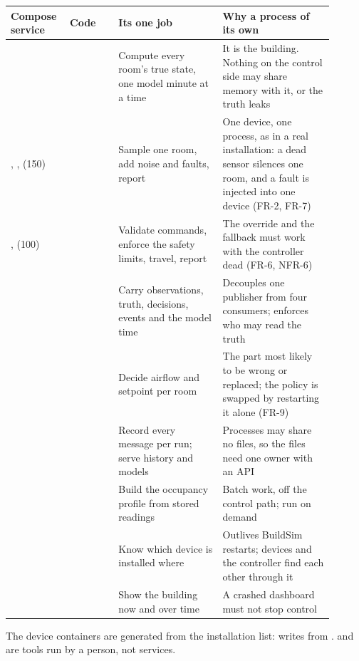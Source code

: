 \begin{longtable}[]{@{}L{0.14\linewidth}L{0.14\linewidth}L{0.30\linewidth}L{0.32\linewidth}@{}}
\toprule
\textbf{Compose service} & \textbf{Code} & \textbf{Its one job} & \textbf{Why a process of its own} \\
\midrule
\endhead
{} &  & Compute every room's true state, one
model minute at a time & It is the building. Nothing on the control side may
share memory with it, or the truth leaks \\
, ,  (150) &  &
Sample one room, add noise and faults, report & One device, one process, as in
a real installation: a dead sensor silences one room, and a fault is injected
into one device (FR-2, FR-7) \\
,  (100) &  & Validate
commands, enforce the safety limits, travel, report & The override and the
fallback must work with the controller dead (FR-6, NFR-6) \\
 &  & Carry observations, truth,
decisions, events and the model time & Decouples one publisher from four
consumers; enforces who may read the truth \\
 &  & Decide airflow and setpoint per
room & The part most likely to be wrong or replaced; the policy is swapped by
restarting it alone (FR-9) \\
 &  & Record every message per run; serve
history and models & Processes may share no files, so the files need one owner
with an API \\
 &  & Build the occupancy profile from stored
readings & Batch work, off the control path; run on demand \\
 &  & Know which device is installed where &
Outlives BuildSim restarts; devices and the controller find each other through
it \\
 &  & Show the building now and over time & A crashed
dashboard must not stop control \\
\bottomrule
\end{longtable}

The device containers are generated from the installation list:
 writes  from
.  and  are tools
run by a person, not services.

